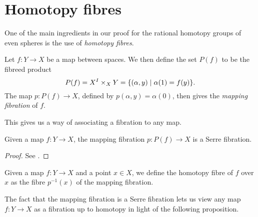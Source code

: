 \documentclass[../main.tex]{subfiles}
\begin{document}
\section{Homotopy fibres}
One of the main ingredients in our proof for the rational homotopy groups of even
spheres is the use of \emph{homotopy fibres}.
\begin{definition}
Let \( f:Y\rightarrow X \) be a map between spaces. We then define
the set \( P(f) \) to be the fibreed product
\begin{equation}
   P(f) = X^I\times_X Y = \{(\alpha, y)\hspace{1mm} | \hspace{1mm} \alpha(1)=f(y)\}.
\end{equation}
The map \( p:P(f)\rightarrow X \), defined by \( p(\alpha, y)=\alpha(0) \),
then gives the \emph{mapping fibration} of \( f \).
\end{definition}
This gives us a way of associating a fibration to any map.
\begin{proposition}
  Given a map \( f:Y\rightarrow X \), the mapping fibration \(p:P(f)\rightarrow X  \) 
  is a Serre fibration.
\end{proposition}
\begin{proof}
   See \cite[]{DaKi12}.
\end{proof}

\begin{definition}
   Given a map \( f:Y\rightarrow X \) and a point \( x\in X \), we
   define the homotopy fibre of \( f \) over \( x \) as
   the fibre \( p^{-1}(x) \) of the mapping fibration.
\end{definition}

The fact that the mapping fibration is a Serre fibration lets us view
any map \( f: Y\rightarrow X \) 
as a fibration up to homotopy in light of the following proposition.
\end{document}
